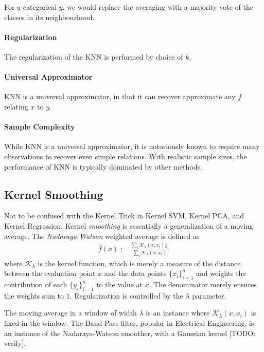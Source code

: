 \documentclass[12pt,a4paper]{article}
\theoremstyle{plain}
\theoremstyle{definition}
\newcommand{\hyp}{f}
\newcommand{\kernel}{\mathcal{K}}
\begin{document}
For a categorical $y$, we would replace the averaging with a majority vote of the classes in its neighbourhood.

\paragraph{Regularization}
The regularization of the KNN is performed by choice of $k$.

\paragraph{Universal Approximator}
KNN is a universal approximator, in that it can recover approximate any $\hyp$ relating $x$ to $y$.

\paragraph{Sample Complexity}
While KNN is a universal approximator, it is notoriously known to require many observations to recover even simple relations. With realistic sample sizes, the performance of KNN is typically dominated by other methods.




\subsection{Kernel Smoothing}
\label{sec:kernel}
Not to be confused with the Kernel Trick in Kernel SVM, Kernel PCA, and Kernel Regression.
Kernel \emph{smoothing} is essentially a generalization of a moving average.
The \emph{Nadaraya-Watson} weighted average is defined as 
\begin{align}
	\hat{\hyp}(x):= \frac{\sum_i \kernel_\lambda(x,x_i)y_i}{\sum_i \kernel_\lambda(x,x_i)}
\end{align}
where $\kernel_\lambda$ is the kernel function, which is merely a measure of the distance between the evaluation point $x$ and the data points $\{ x_i \}_{i=1}^n$ and weights the contribution of each $\{ y_i \}_{i=1}^n$ to the value at $x$.
The denominator merely ensures the weights sum to $1$.
Regularization is controlled by the $\lambda$ parameter.

The moving average in a window of width $\lambda$ is an instance where $\kernel_\lambda(x,x_i)$ is fixed in the window.
The Band-Pass filter, popular in Electrical Engineering, is an instance of the Nadaraya-Watson smoother, with a Gaussian kernel [TODO: verify].
\end{document}
